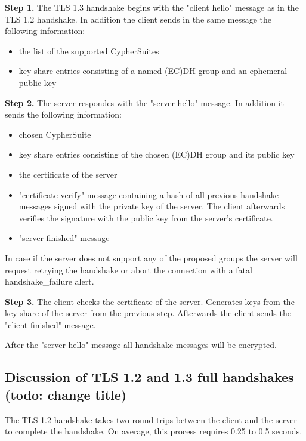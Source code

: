\textbf{Step 1.} The TLS 1.3 handshake begins with the "client hello" message as in the TLS 1.2 handshake. In addition the client sends in the same message the following information:

\begin{itemize}
	\item the list of the supported CypherSuites
	\item key share entries consisting of a named (EC)DH group and an ephemeral public key
\end{itemize}

\textbf{Step 2.} The server respondes with the "server hello" message. In addition it sends the following information:

\begin{itemize}
	\item chosen CypherSuite
	\item key share entries consisting of the chosen (EC)DH group and its public key
	\item the certificate of the server
	\item "certificate verify" message containing a hash of all previous handshake messages signed with the private key of the server. The client afterwards verifies the signature with the public key from the server's certificate. 
	\item "server finished" message
\end{itemize}

In case if the server does not support any of the proposed groups the server will request retrying the handshake or abort the connection with a fatal handshake\_failure alert.

\textbf{Step 3.} The client checks the certificate of the server. Generates keys from the key share of the server from the previous step. Afterwards the client sends the "client finished" message. \cite{Hassenstein}\cite{sslstore:handshake}

After the "server hello" message all handshake messages will be encrypted.

\subsection{Discussion of TLS 1.2 and 1.3 full handshakes (todo: change title)}
\label{subsec:comparison_handshake}

The TLS 1.2 handshake takes two round trips between the client and the server to complete the handshake. On average, this process requires 0.25 to 0.5 seconds.

